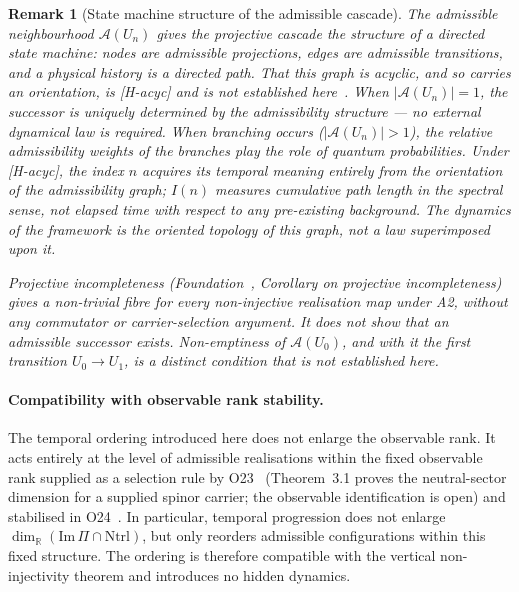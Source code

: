 \documentclass[11pt,a4paper]{article}
\newtheorem{remark}{Remark}
\begin{document}
    \begin{remark}[State machine structure of the admissible cascade]
      \label{rem:state-machine-pto}
      The admissible neighbourhood $\mathcal{A}(U_n)$ gives the projective
      cascade the structure of a directed state machine: nodes are admissible
      projections, edges are admissible transitions, and a physical history
      is a directed path.
      That this graph is acyclic, and so carries an orientation, is [H-acyc]
      and is not established here~\cite{Beau2026m}.
      When $|\mathcal{A}(U_n)| = 1$, the successor is uniquely determined by
      the admissibility structure — no external dynamical law is required.
      When branching occurs ($|\mathcal{A}(U_n)| > 1$), the relative
      admissibility weights of the branches play the role of quantum
      probabilities.
      Under [H-acyc], the index $n$ acquires its temporal meaning entirely
      from the orientation of the admissibility graph; $I(n)$ measures
      cumulative path length in the spectral sense, not elapsed time with
      respect to any pre-existing background.
      The dynamics of the framework is the oriented topology of this graph,
      not a law superimposed upon it.

      Projective incompleteness (Foundation~\cite{Beau2026m}, Corollary on
      projective incompleteness) gives a non-trivial fibre for every non-injective
      realisation map under A2, without any commutator or carrier-selection
      argument.
      It does not show that an admissible successor exists.
      Non-emptiness of $\mathcal{A}(U_0)$, and with it the first transition
      $U_0 \to U_1$, is a distinct condition that is not established here.
    \end{remark}

  \paragraph{Compatibility with observable rank stability.}
    The temporal ordering introduced here does not enlarge the observable
    rank.
    It acts entirely at the level of admissible realisations within the
    fixed observable rank supplied as a selection rule by O23~\cite{Beau2026a27}
    (Theorem~3.1 proves the neutral-sector dimension for a supplied spinor carrier;
    the observable identification is open) and stabilised in O24~\cite{Beau2026a28}.
    In particular, temporal progression does not enlarge
    $\dim_{\mathbb{R}}(\mathrm{Im}\,\Pi \cap \mathrm{Ntrl})$, but only
    reorders admissible configurations within this fixed structure.
    The ordering is therefore compatible with the vertical non-injectivity
    theorem and introduces no hidden dynamics.
\end{document}

